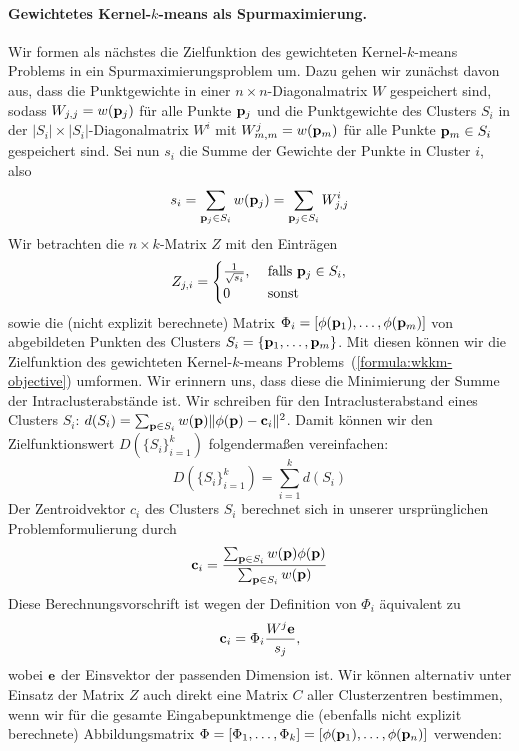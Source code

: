 \paragraph{Gewichtetes Kernel-$k$-means als Spurmaximierung.}
Wir formen als nächstes die Zielfunktion des gewichteten Kernel-$k$-means Problems in ein Spurmaximierungsproblem um.
Dazu gehen wir zunächst davon aus, dass die Punktgewichte in einer $n \times n$-Diagonalmatrix $W$ gespeichert sind, sodass
$W_{j,j} = w(\mathbf{p}_j)$ für alle Punkte $\mathbf{p}_j$ und die Punktgewichte des Clusters $S_i$ in der
$\left|S_i\right| \times \left|S_i\right|$-Diagonalmatrix
$W^i$ mit $W_{m,m}^j = w(\mathbf{p}_m)$ für alle Punkte $\mathbf{p}_m \in S_i$ gespeichert sind. 
\absatz
Sei nun $s_i$ die Summe der Gewichte der Punkte in Cluster $i$, also
\[ s_i = \sum_{\mathbf{p}_j \in S_i} w(\mathbf{p}_j) = \sum_{\mathbf{p}_j \in S_i} W_{j,j}^i \]
Wir betrachten die $n \times k$-Matrix $Z$ mit den Einträgen
\[ Z_{j, i} = 	\begin{cases}
					\frac{1}{\sqrt{s_i}}, & \textrm{ falls } \mathbf{p}_j \in S_i, \\
					0 & \textrm{ sonst }
				\end{cases} \]
sowie die (nicht explizit berechnete) Matrix $\Phi_i = [\phi(\mathbf{p}_1), \dots, \phi(\mathbf{p}_m)]$ von abgebildeten Punkten
des Clusters $S_i = \{ \mathbf{p}_1, \dots, \mathbf{p}_m \}$. Mit diesen können wir
die Zielfunktion des gewichteten Kernel-$k$-means Problems~(\ref{formula:wkkm-objective}) umformen. Wir erinnern uns, dass diese
die Minimierung der Summe der Intraclusterabstände ist. Wir schreiben für den Intraclusterabstand eines Clusters $S_i$:
$d(S_i) = \sum_{\mathbf{p} \in S_i} w(\mathbf{p}) \lVert {\phi(\ensuremath{\mathbf{p}})} - {\mathbf{c}_i} \rVert^2$. Damit können wir den Zielfunktionswert
$D(\{S_i\}_{i=1}^{k})$ folgendermaßen vereinfachen:
\[ D(\{S_i\}_{i=1}^{k}) = \sum_{i=1}^k d(S_i) \]
Der Zentroidvektor $c_i$ des Clusters $S_i$ berechnet sich in unserer ursprünglichen Problemformulierung durch
\[ \mathbf{c}_i = \frac{\sum_{\mathbf{p} \in S_i} w(\mathbf{p}) \phi(\mathbf{p})}{\sum_{\mathbf{p} \in S_i} w(\mathbf{p})} \]
Diese Berechnungsvorschrift ist wegen der Definition von $\Phi_i$ äquivalent zu
\[ \mathbf{c}_i = \Phi_i \frac{W^j \mathbf{e}}{s_j}, \]
wobei $\mathbf{e}$ der Einsvektor der passenden Dimension ist.
Wir können alternativ unter Einsatz der Matrix $Z$ auch direkt eine Matrix $C$ aller Clusterzentren bestimmen,
wenn wir für die gesamte Eingabepunktmenge die (ebenfalls nicht explizit berechnete) Abbildungsmatrix
$\Phi = [\Phi_1, \dots, \Phi_k] = [\phi(\mathbf{p}_1), \dots, \phi(\mathbf{p}_n)]$ verwenden:
